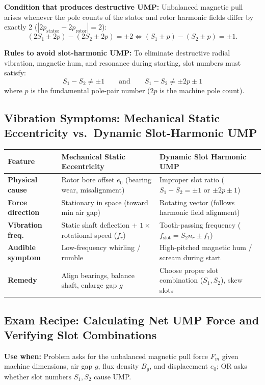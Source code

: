 \textbf{Condition that produces destructive UMP:}
Unbalanced magnetic pull arises whenever the pole counts of the stator and rotor harmonic fields differ by exactly 2 ($|2p_{\mathrm{stator}} - 2p_{\mathrm{rotor}}| = 2$):
\begin{equation}
(2S_1 \pm 2p) - (2S_2 \pm 2p) = \pm 2 \iff (S_1 \pm p) - (S_2 \pm p) = \pm 1.
\end{equation}

\textbf{Rules to avoid slot-harmonic UMP:}
To eliminate destructive radial vibration, magnetic hum, and resonance during starting, slot numbers must satisfy:
\begin{equation}
\boxed{S_1 - S_2 \neq \pm 1 \qquad\text{and}\qquad S_1 - S_2 \neq \pm 2p \pm 1}
\end{equation}
where $p$ is the fundamental pole-pair number ($2p$ is the machine pole count).

\subsection{Vibration Symptoms: Mechanical Static Eccentricity vs.\ Dynamic Slot-Harmonic UMP}
\begin{center}
\begin{tabular}{@{}p{}p{}p{}@{}}
\toprule
\textbf{Feature} & \textbf{Mechanical Static Eccentricity} & \textbf{Dynamic Slot Harmonic UMP} \\
\midrule
\textbf{Physical cause} & Rotor bore offset $e_0$ (bearing wear, misalignment) & Improper slot ratio ($S_1 - S_2 = \pm 1$ or $\pm 2p \pm 1$) \\
\textbf{Force direction} & Stationary in space (toward min air gap) & Rotating vector (follows harmonic field alignment) \\
\textbf{Vibration freq.} & Static shaft deflection + $1\times$ rotational speed ($f_r$) & Tooth-passing frequency ($f_{\mathrm{slot}} = S_2 n_r \pm f_1$) \\
\textbf{Audible symptom} & Low-frequency whirling / rumble & High-pitched magnetic hum / scream during start \\
\textbf{Remedy} & Align bearings, balance shaft, enlarge gap $g$ & Choose proper slot combination ($S_1, S_2$), skew slots \\
\bottomrule
\end{tabular}
\end{center}

\subsection{Exam Recipe: Calculating Net UMP Force and Verifying Slot Combinations}
\textbf{Use when:} Problem asks for the unbalanced magnetic pull force $F_m$ given machine dimensions, air gap $g$, flux density $B_g$, and displacement $e_0$; OR asks whether slot numbers $S_1, S_2$ cause UMP.

